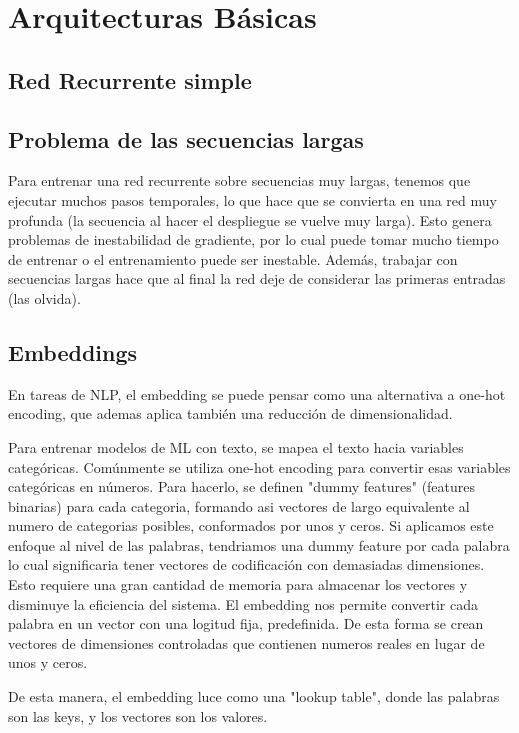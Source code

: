 \section{Arquitecturas Básicas}
\subsection{Red Recurrente simple}

\subsection{Problema de las secuencias largas}
Para entrenar una red recurrente sobre secuencias muy largas, tenemos que ejecutar muchos pasos temporales, lo que hace que se convierta en una red muy profunda (la secuencia al hacer el despliegue se vuelve muy larga). Esto genera problemas de  inestabilidad de gradiente, por lo cual puede tomar mucho tiempo de entrenar o el entrenamiento puede ser inestable. Además, trabajar con secuencias largas hace que al final la red deje de considerar las primeras entradas (las olvida). 

\subsection{Embeddings}
En tareas de NLP, el embedding se puede pensar como una alternativa a one-hot encoding, que ademas aplica también una reducción de dimensionalidad. 

Para entrenar modelos de ML con texto, se mapea el texto hacia variables categóricas. Comúnmente se utiliza one-hot encoding para convertir esas variables categóricas en números. Para hacerlo, se definen "dummy features" (features binarias) para cada categoria, formando asi vectores de largo equivalente al numero de categorias posibles, conformados por unos y ceros. Si aplicamos este enfoque al nivel de las palabras, tendriamos una dummy feature por cada palabra lo cual significaria tener vectores de codificación con demasiadas dimensiones. Esto requiere una gran cantidad de memoria para almacenar los vectores y disminuye la eficiencia del sistema. 
El embedding nos permite convertir cada palabra en un vector con una logitud fija, predefinida. De esta forma se crean vectores de dimensiones controladas que contienen numeros reales en lugar de unos y ceros. 

De esta manera, el embedding luce como una "lookup table", donde las palabras son las keys, y los vectores son los valores. 
